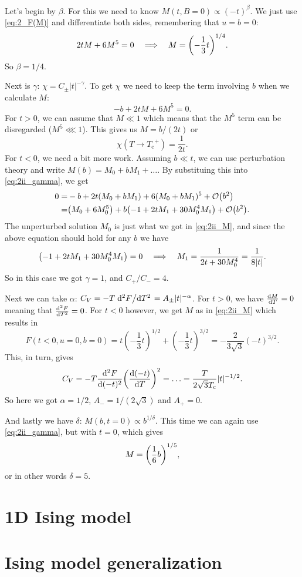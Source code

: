 \documentclass[11pt,letter, swedish, english
]{article}
\newcommand{\Tc}{\ensuremath{T_{\text{c}}}}
\begin{document}
Let's begin by $\beta$. For this we need to know
$M(t,B=0)\propto(-t)^\beta$. We just use \eqref{eq:2_F(M)} and
differentiate both sides, remembering that $u=b=0$:
\begin{equation}\label{eq:2ii_M}
2tM+6M^5=0\quad\Longrightarrow\quad
M=\qty(-\frac{1}{3}t)^{1/4}.
\end{equation}
So $\beta=1/4$.

Next is $\gamma$: $\chi=C_\pm|t|^{-\gamma}$. To get $\chi$ we need to
keep the term involving $b$ when we calculate $M$:
\begin{equation}\label{eq:2ii_gamma}
-b+2tM+6M^5=0.
\end{equation}
For $t>0$, we can assume that $M\ll1$ which means that the $M^5$ term
can be disregarded ($M^5\lll1$). This gives us $M=b/(2t)$ or
\begin{equation}
\chi(T\to\Tc^+)=\frac{1}{2t}.
\end{equation}
For $t<0$, we need a bit more work.
Assuming $b\ll t$, we can use perturbation theory and write
$M(b)=M_0+bM_1+\ldots$. By substituing this into \eqref{eq:2ii_gamma},
we get
\begin{equation}
\begin{aligned}
0=&-b+2t(M_0+bM_1)+6(M_0+bM_1)^5+\order{b^2}\\
=& \qty(M_0+6M_0^5)+b\qty(-1+2tM_1+30M_0^4M_1) +\order{b^2}.
\end{aligned}
\end{equation}
The unperturbed solution $M_0$ is just what we got in
\eqref{eq:2ii_M}, and since the above equation should hold for any
$b$ we have
\begin{equation}
\qty(-1+2tM_1+30M_0^4M_1)=0 \quad\Longrightarrow\quad
M_1=\frac{1}{2t+30M_0^4}=\frac{1}{8|t|}.
\end{equation}
So in this case we got $\gamma=1$, and $C_+/C_-=4$.

Next we can take $\alpha$:
$C_V=-T\dv*[2]{F}{T}=A_\pm|t|^{-\alpha}$. For $t>0$, we have $\dv{M}{T}=0$
meaning that $\dv[2]{F}{T}=0$. For $t<0$ however, we get $M$ as in
\eqref{eq:2ii_M} which results in
\begin{equation}
F(t<0, u=0, b=0)=t(-\frac{1}{3}t)^{1/2}+(-\frac{1}{3}t)^{3/2}
=-\frac{2}{3\sqrt{3}}(-t)^{3/2}.
\end{equation}
This, in turn, gives
\begin{equation}
C_V=-T\dv[2]{F}{(-t)}\qty(\dv{(-t)}{T})^2=\ldots
=\frac{T}{2\sqrt{3}\Tc}|t|^{-1/2}.
\end{equation}
So here we got $\alpha=1/2$, $A_-=1/(2\sqrt{3})$ and $A_+=0$.

And lastly we have $\delta$: $M(b,t=0)\propto b^{1/\delta}$. This time
we can again use \eqref{eq:2ii_gamma}, but with $t=0$, which gives
\begin{equation}
M=\qty(\frac{1}{6}b)^{1/5},
\end{equation}
or in other words $\delta=5$.



\section{1D Ising model}



\section{Ising model generalization}
\end{document}
